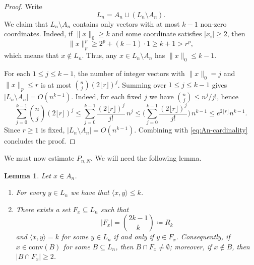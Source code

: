 \documentclass[11pt,a4paper]{article} %
\newtheorem{lemma}[theorem]{Lemma}
\theoremstyle{definition}
\theoremstyle{remark}
\newcommand{\conv}{\mathrm{conv}}
\newcommand{\1}{\mathds{1}}
\begin{document}
\begin{proof}

Write $$L_n= A_n \sqcup (L_n \setminus A_n).$$
We claim that $L_n\setminus A_n$ contains only vectors with at most $k-1$ non-zero coordinates.
Indeed, if $\|x\|_0 \geq k$ and some coordinate satisfies $|x_i|\ge 2$, then
\[
\|x\|_p^p \ge 2^p + (k-1)\cdot 1  \geq k+1 > r^p,
\]
which means that $x \notin L_n$. Thus, any $x\in L_n\setminus A_n$ has $\|x\|_0\le k-1$.

For each $1 \leq j\le k-1$, the number of integer vectors with $\|x\|_0=j$ and $\|x\|_p\le r$ is at most
$\binom{n}{j}(2\lfloor r\rfloor)^j$. Summing over $1 \leq j\le k-1$ gives
$|L_n\setminus A_n|=O(n^{k-1})$. Indeed, for each fixed $j$ we have $\binom{n}{j}\le n^j/j!$, hence
\[
\sum_{j=0}^{k-1}\binom{n}{j}(2\lfloor r\rfloor)^j
\le \sum_{j=0}^{k-1}\frac{(2\lfloor r\rfloor)^j}{j!}\,n^j
\le \Big(\sum_{j=0}^{k-1}\frac{(2\lfloor r\rfloor)^j}{j!}\Big)\,n^{k-1} \leq e^{2\lfloor r \rfloor} n^{k-1}.
\]
Since $r\geq1$ is fixed, $|L_n\setminus A_n|=O(n^{k-1})$.
 Combining with \eqref{eq:An-cardinality} concludes the proof.
\end{proof}

We must now estimate $P_{n,N}$. We will need the following lemma.

\begin{lemma}\label{lem:l1-supporting}
Let $x \in A_n$.
\begin{enumerate}
\item[{\rm (i)}] For  every $y \in L_n$ we have that $\langle x,y \rangle \leq k$.

\item[{\rm (ii)}] There exists a set $F_x \subseteq L_n$  such that $$|F_x|=\binom{2k-1}{k} \coloneq R_k$$ and $\langle x, y\rangle = k$ for some $y \in L_n$  if and only if $y \in F_x$. Consequently, if $x \in \conv(B)$ for some $B \subseteq L_n$, then $B \cap F_x \neq \emptyset$; moreover, if $x \notin B $, then $|B \cap F_x| \geq 2$.
\end{enumerate}
\end{lemma}
\end{document}
